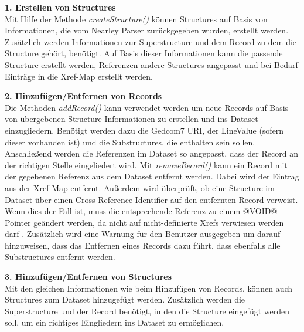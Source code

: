 \vspace{1em}
\textbf{1. Erstellen von Structures} \vspace{0.5em} \\
Mit Hilfe der Methode \textit{createStructure()} können Structures auf Basis von Informationen, die vom Nearley Parser zurückgegeben wurden, erstellt werden. Zusätzlich werden Informationen zur Superstructure und dem Record zu dem die Structure gehört, benötigt. Auf Basis dieser Informationen kann die passende Structure erstellt werden, Referenzen andere Structures angepasst und bei Bedarf Einträge in die Xref-Map erstellt werden. 

\vspace{1em}
\textbf{2. Hinzufügen/Entfernen von Records} \vspace{0.5em} \\
Die Methoden \textit{addRecord()} kann verwendet werden um neue Records auf Basis von übergebenen Structure Informationen zu erstellen und ins Dataset einzugliedern. Benötigt werden dazu die Gedcom7 URI, der LineValue (sofern dieser vorhanden ist) und die Substructures, die enthalten sein sollen. Anschließend werden die Referenzen im Dataset so angepasst, dass der Record an der richtigen Stelle eingeliedert wird. Mit \textit{removeRecord()} kann ein Record mit der gegebenen Referenz aus dem Dataset entfernt werden. Dabei wird der Eintrag aus der Xref-Map entfernt. Außerdem wird überprüft, ob eine Structure im Dataset über einen Cross-Reference-Identifier auf den entfernten Record verweist. Wenn dies der Fall ist, muss die entsprechende Referenz zu einem @VOID@-Pointer geändert werden, da nicht auf nicht-definierte Xrefs verwiesen werden darf \cite{GEDCOM}. Zusätzlich wird eine Warnung für den Benutzer ausgegeben um darauf hinzuweisen, dass das Entfernen eines Records dazu führt, dass ebenfalls alle Substructures entfernt werden. 


\vspace{1em}
\textbf{3. Hinzufügen/Entfernen von Structures} \vspace{0.5em} \\
Mit den gleichen Informationen wie beim Hinzufügen von Records, können auch Structures zum Dataset hinzugefügt werden. Zusätzlich werden die Superstructure und der Record benötigt, in den die Structure eingefügt werden soll, um ein richtiges Eingliedern ins Dataset zu ermöglichen. 


